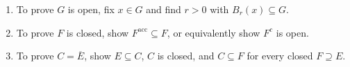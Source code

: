 \begin{method} \label{meth:metric-topology-proof-patterns}\label{meth:metric-topology-proof-patterns-source-todo} 
\begin{enumerate}[label=(\roman*)]
\setlength{\itemsep}{0pt}
\item To prove $G$ is open, fix $x\in G$ and find $r>0$ with $B_r(x)\subseteq G$.
\item To prove $F$ is closed, show $F^{\operatorname{acc}}\subseteq F$, or equivalently show $F^c$ is open.
\item To prove $C=\overline{E}$, show $E\subseteq C$, $C$ is closed, and $C\subseteq F$ for every closed $F\supseteq E$.
\end{enumerate}
\end{method}
